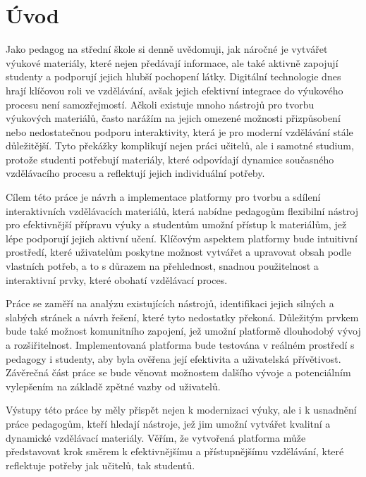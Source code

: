 \chapter*{Úvod}
\setcounter{page}{1}

Jako pedagog na střední škole si denně uvědomuji, jak náročné je vytvářet výukové materiály, které nejen předávají informace, ale také aktivně zapojují studenty a podporují jejich hlubší pochopení látky. 
Digitální technologie dnes hrají klíčovou roli ve vzdělávání, avšak jejich efektivní integrace do výukového procesu není samozřejmostí. 
Ačkoli existuje mnoho nástrojů pro tvorbu výukových materiálů, často narážím na jejich omezené možnosti přizpůsobení nebo nedostatečnou podporu interaktivity, která je pro moderní vzdělávání stále důležitější. 
Tyto překážky komplikují nejen práci učitelů, ale i samotné studium, protože studenti potřebují materiály, které odpovídají dynamice současného vzdělávacího procesu a reflektují jejich individuální potřeby.

Cílem této práce je návrh a implementace platformy pro tvorbu a sdílení interaktivních vzdělávacích materiálů, která nabídne pedagogům flexibilní nástroj pro efektivnější přípravu výuky a studentům umožní přístup k materiálům, jež lépe podporují jejich aktivní učení. 
Klíčovým aspektem platformy bude intuitivní prostředí, které uživatelům poskytne možnost vytvářet a upravovat obsah podle vlastních potřeb, a to s důrazem na přehlednost, snadnou použitelnost a interaktivní prvky, které obohatí vzdělávací proces.

Práce se zaměří na analýzu existujících nástrojů, identifikaci jejich silných a slabých stránek a návrh řešení, které tyto nedostatky překoná. 
Důležitým prvkem bude také možnost komunitního zapojení, jež umožní platformě dlouhodobý vývoj a rozšiřitelnost. 
Implementovaná platforma bude testována v reálném prostředí s pedagogy i studenty, aby byla ověřena její efektivita a uživatelská přívětivost. 
Závěrečná část práce se bude věnovat možnostem dalšího vývoje a potenciálním vylepšením na základě zpětné vazby od uživatelů.

Výstupy této práce by měly přispět nejen k modernizaci výuky, ale i k usnadnění práce pedagogům, kteří hledají nástroje, jež jim umožní vytvářet kvalitní a dynamické vzdělávací materiály. 
Věřím, že vytvořená platforma může představovat krok směrem k efektivnějšímu a přístupnějšímu vzdělávání, které reflektuje potřeby jak učitelů, tak studentů.